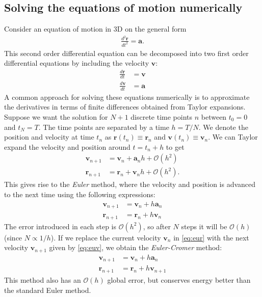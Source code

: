\documentclass{article}
\newcommand{\mb}[1]{\mathbf{#1}}
\begin{document}
\subsection{Solving the equations of motion numerically} \label{section:num}
Consider an equation of motion in 3D on the general form
\begin{align*}
    \frac{d^2\mb{r}}{dt^2} = \mb{a}.
\end{align*}
This second order differential equation can be decomposed into two first order differential equations by including the velocity $\mb{v}$:
\begin{align*}
    \frac{d\mb{r}}{dt} &= \mb{v} \\
    \frac{d\mb{v}}{dt} &= \mb{a}
\end{align*}
A common approach for solving these equations numerically is to approximate the derivatives in terms of finite differences obtained from Taylor expansions. Suppose we want the solution for $N+1$ discrete time points $n$ between $t_0 = 0$ and $t_N = T$. The time points are separated by a time $h = T/N$. We denote the position and velocity at time $t_n$ as $\mb{r}(t_n) \equiv \mb{r}_n$ and $\mb{v}(t_n) \equiv \mb{v}_n$. We can Taylor expand the velocity and position around $t = t_n + h$ to get
\begin{align}
    \mb{v}_{n+1} &= \mb{v}_n + \mb{a}_n h + \mathcal{O}(h^2) \label{eq:teuv} \\
    \mb{r}_{n+1} &= \mb{r}_n + \mb{v}_n h + \mathcal{O}(h^2). \label{eq:teur}
\end{align}
This gives rise to the \textit{Euler} method, where the velocity and position is advanced to the next time using the following expressions:
\begin{align}
    \mb{v}_{n+1} &= \mb{v}_n + h\mb{a}_n \label{eq:euv} \\
    \mb{r}_{n+1} &= \mb{r}_n + h\mb{v}_n \label{eq:eur}
\end{align}
The error introduced in each step is $\mathcal{O}(h^2)$, so after $N$ steps it will be $\mathcal{O}(h)$ (since $N \propto 1/h$). If we replace the current velocity $\mb{v}_n$ in \eqref{eq:eur} with the next velocity $\mb{v}_{n+1}$ given by \eqref{eq:euv}, we obtain the \textit{Euler-Cromer} method:
\begin{align}
    \mb{v}_{n+1} &= \mb{v}_n + h\mb{a}_n \label{eq:eucv} \\
    \mb{r}_{n+1} &= \mb{r}_n + h\mb{v}_{n+1} \label{eq:eucr}
\end{align}
This method also has an $\mathcal{O}(h)$ global error, but conserves energy better than the standard Euler method. \\\\
\end{document}
